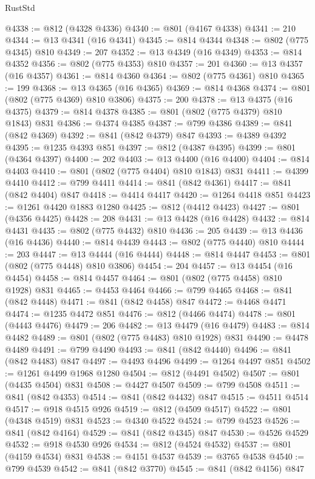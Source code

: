 \begin{lexlean}{RustStd}
\begin{coremodule}
{\begin{coremodule}
{{{{{@4338 := @812 (@4328 @4336)
@4340 := @801 (@4167 @4338)
@4341 := 210
@4344 := @13 @4341 (@16 @4341)
@4345 := @814 @4344
@4348 := @802 (@775 @4345) @810
@4349 := 207
@4352 := @13 @4349 (@16 @4349)
@4353 := @814 @4352
@4356 := @802 (@775 @4353) @810
@4357 := 201
@4360 := @13 @4357 (@16 @4357)
@4361 := @814 @4360
@4364 := @802 (@775 @4361) @810
@4365 := 199
@4368 := @13 @4365 (@16 @4365)
@4369 := @814 @4368
@4374 := @801 (@802 (@775 @4369) @810 @3806)
@4375 := 200
@4378 := @13 @4375 (@16 @4375)
@4379 := @814 @4378
@4385 := @801 (@802 (@775 @4379) @810 @1843) @831
@4386 := @4374 @4385
@4387 := @799 @4386
@4389 := @841 (@842 @4369)
@4392 := @841 (@842 @4379) @847
@4393 := @4389 @4392
@4395 := @1235 @4393 @851
@4397 := @812 (@4387 @4395)
@4399 := @801 (@4364 @4397)
@4400 := 202
@4403 := @13 @4400 (@16 @4400)
@4404 := @814 @4403
@4410 := @801 (@802 (@775 @4404) @810 @1843) @831
@4411 := @4399 @4410
@4412 := @799 @4411
@4414 := @841 (@842 @4361)
@4417 := @841 (@842 @4404) @847
@4418 := @4414 @4417
@4420 := @1264 @4418 @851
@4423 := @1261 @4420 @1883 @1280
@4425 := @812 (@4412 @4423)
@4427 := @801 (@4356 @4425)
@4428 := 208
@4431 := @13 @4428 (@16 @4428)
@4432 := @814 @4431
@4435 := @802 (@775 @4432) @810
@4436 := 205
@4439 := @13 @4436 (@16 @4436)
@4440 := @814 @4439
@4443 := @802 (@775 @4440) @810
@4444 := 203
@4447 := @13 @4444 (@16 @4444)
@4448 := @814 @4447
@4453 := @801 (@802 (@775 @4448) @810 @3806)
@4454 := 204
@4457 := @13 @4454 (@16 @4454)
@4458 := @814 @4457
@4464 := @801 (@802 (@775 @4458) @810 @1928) @831
@4465 := @4453 @4464
@4466 := @799 @4465
@4468 := @841 (@842 @4448)
@4471 := @841 (@842 @4458) @847
@4472 := @4468 @4471
@4474 := @1235 @4472 @851
@4476 := @812 (@4466 @4474)
@4478 := @801 (@4443 @4476)
@4479 := 206
@4482 := @13 @4479 (@16 @4479)
@4483 := @814 @4482
@4489 := @801 (@802 (@775 @4483) @810 @1928) @831
@4490 := @4478 @4489
@4491 := @799 @4490
@4493 := @841 (@842 @4440)
@4496 := @841 (@842 @4483) @847
@4497 := @4493 @4496
@4499 := @1264 @4497 @851
@4502 := @1261 @4499 @1968 @1280
@4504 := @812 (@4491 @4502)
@4507 := @801 (@4435 @4504) @831
@4508 := @4427 @4507
@4509 := @799 @4508
@4511 := @841 (@842 @4353)
@4514 := @841 (@842 @4432) @847
@4515 := @4511 @4514
@4517 := @918 @4515 @926
@4519 := @812 (@4509 @4517)
@4522 := @801 (@4348 @4519) @831
@4523 := @4340 @4522
@4524 := @799 @4523
@4526 := @841 (@842 @4164)
@4529 := @841 (@842 @4345) @847
@4530 := @4526 @4529
@4532 := @918 @4530 @926
@4534 := @812 (@4524 @4532)
@4537 := @801 (@4159 @4534) @831
@4538 := @4151 @4537
@4539 := @3765 @4538
@4540 := @799 @4539
@4542 := @841 (@842 @3770)
@4545 := @841 (@842 @4156) @847
}}}}}
\end{coremodule}}
\end{coremodule}
\end{lexlean}
